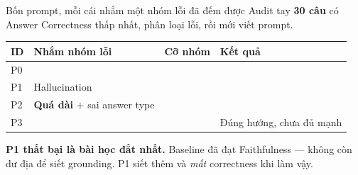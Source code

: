 \begin{frame}[shrink=20]{Bốn prompt, mỗi cái nhắm một nhóm lỗi đã đếm được}
  \small
  Audit tay \textbf{30 câu} có Answer Correctness thấp nhất, phân loại lỗi,
  rồi mới viết prompt.

  \begin{tabularx}{\textwidth}{@{}p{1cm} L p{1.3cm} p{2.4cm}@{}}
    \toprule
    \textbf{ID} & \textbf{Nhắm nhóm lỗi} & \textbf{Cỡ nhóm} & \textbf{Kết quả} \\
    \midrule
    P0 &  & \muted{---} &  \\
    P1 & Hallucination &  &  \\
    P2 & \textbf{Quá dài} $+$ sai answer type &  &  \\
    P3 &  & \muted{---} & Đúng hướng, chưa đủ mạnh \\
    \bottomrule
  \end{tabularx}

  \vspace{0.6em}
  \textbf{P1 thất bại là bài học đắt nhất.} Baseline đã đạt Faithfulness
  \NumPzeroFaith{} --- không còn dư địa để siết grounding. P1 siết thêm và
  \emph{mất} correctness khi làm vậy.

\end{frame}

